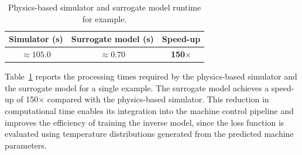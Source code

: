 \begin{table}[b]
	\centering
	\footnotesize
	\caption{Physics-based simulator and surrogate model runtime for example.}
	\label{tab:surrogate_perf}
	\setlength{\tabcolsep}{5pt}
	\begin{tabular}{ccc}
		\toprule
		\textbf{Simulator (s)} & \textbf{Surrogate model (s)} & \textbf{Speed-up} \\
		\midrule
		$\approx 105.0$ & $\approx 0.70$ & \textbf{150$\times$} \\
		\bottomrule
	\end{tabular}
\end{table}

Table~\ref{tab:surrogate_perf} reports the processing times required by the physics-based simulator and the surrogate model for a single example. The surrogate model achieves a speed-up of 150$\times$ compared with the physics-based simulator. This reduction in computational time enables its integration into the machine control pipeline and improves the efficiency of training the inverse model, since the loss function is evaluated using temperature distributions generated from the predicted machine parameters.

